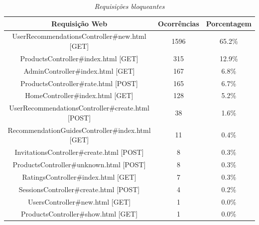 \begin{table}\centering
\begin{tabular}{c c c}
\hline \hline
\textbf{Requisição Web}
& \textbf{Ocorrências}
& \textbf{Porcentagem} \\ \hline
UserRecommendationsController\#new.html [GET]     & 1596 & 65.2\% \\ 
\hline
ProductsController\#index.html [GET]              &  315 & 12.9\% \\ 
\hline
AdminController\#index.html [GET]                 &  167 &  6.8\% \\
\hline
ProductsController\#rate.html [POST]              &  165 &  6.7\% \\
\hline
HomeController\#index.html [GET]                  &  128 &  5.2\% \\ 
\hline
UserRecommendationsController\#create.html [POST] &   38 &  1.6\% \\
\hline
RecommendationGuidesController\#index.html [GET]  &   11 &  0.4\% \\  
\hline
InvitationsController\#create.html [POST]         &    8 &  0.3\% \\  
\hline
ProductsController\#unknown.html [POST]           &    8 &  0.3\% \\  
\hline
RatingsController\#index.html [GET]               &    7 &  0.3\% \\  
\hline
SessionsController\#create.html [POST]            &    4 &  0.2\% \\  
\hline
UsersController\#new.html [GET]                   &    1 &  0.0\% \\  
\hline
ProductsController\#show.html [GET]               &    1 &  0.0\% \\
\hline
\end{tabular}
\caption{\it Requisições bloqueantes \label{table:process_blockers}}
\end{table}



